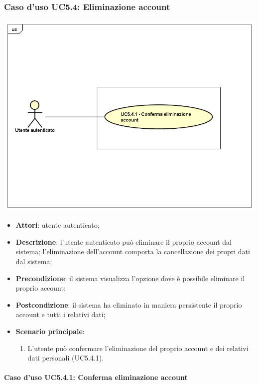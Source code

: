 \subsubsection{Caso d'uso UC5.4: Eliminazione account}
\begin{center}
	\includegraphics[scale=0.5]{UML/UC5_4.png}
\end{center}

\begin{itemize}
	\item \textbf{Attori}: utente autenticato;
	\item \textbf{Descrizione}: l'utente autenticato può eliminare il proprio account dal sistema; l'eliminazione dell'account comporta la cancellazione dei propri dati dal sistema; 
	\item \textbf{Precondizione}: il sistema visualizza l'opzione dove è possibile eliminare il proprio account;
	\item \textbf{Postcondizione}: il sistema ha eliminato in maniera persistente il proprio account e tutti i relativi dati;
	\item \textbf{Scenario principale}:
		\begin{enumerate}
			\item L'utente può confermare l'eliminazione del proprio account e dei relativi dati personali (UC5.4.1).
		\end{enumerate}
\end{itemize}

\paragraph{Caso d'uso UC5.4.1: Conferma eliminazione account}

